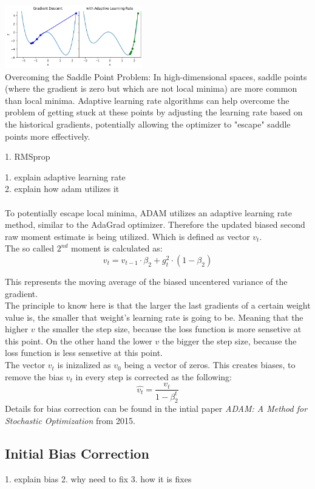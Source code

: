 \documentclass[journal]{IEEEtran}
\begin{document}
\includegraphics[width=0.45\textwidth]{report/figures/GD_adap.png}\\

Overcoming the Saddle Point Problem: In high-dimensional spaces, saddle points (where the gradient is zero but which are not local minima) are more common than local minima. Adaptive learning rate algorithms can help overcome the problem of getting stuck at these points by adjusting the learning rate based on the historical gradients, potentially allowing the optimizer to "escape" saddle points more effectively.

1. RMSprop

1. explain adaptive learning rate\\
2. explain how adam utilizes it\\\\
To potentially escape local minima, ADAM utilizes an adaptive learning rate method, similar to the AdaGrad optimizer. Therefore the updated biased second raw moment estimate is being utilized. Which is defined as vector $v_t$.\\

The so called $2^{nd}$ moment is calculated as:
$$v_t = v_{t-1} \cdot \beta_2 + g_t^2 \cdot (1-\beta_2)$$

This represents the moving average of the biased uncentered variance of the gradient.\\
The principle to know here is that the larger the last gradients of a certain weight value is, the smaller that weight's learning rate is going to be. Meaning that the higher $v$ the smaller the step size, because the loss function is more sensetive at this point. On the other hand the lower $v$ the bigger the step size, because the loss function is less sensetive at this point.\\
The vector $v_t$ is inizalized as $v_0$ being a vector of zeros. This creates biases, to remove the bias $v_t$ in every step is corrected as the following:
$$\hat{v_t}=\frac{v_t}{1-\beta_2^t}$$
Details for bias correction can be found in the intial paper \textit{ADAM: A Method for Stochastic Optimization} from 2015.


\subsection{Initial Bias Correction}
1. explain bias
2. why need to fix
3. how it is fixes
\end{document}
